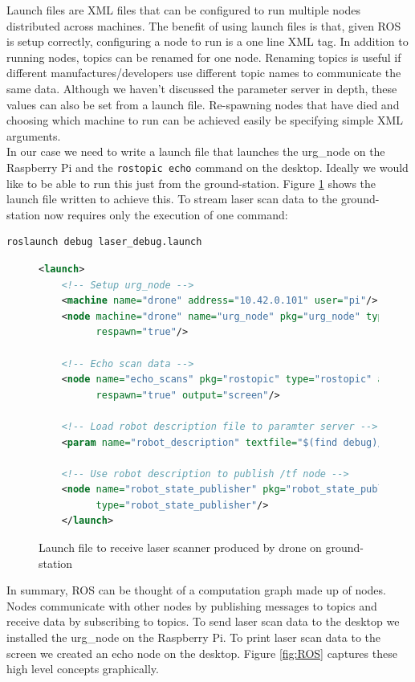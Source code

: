 \documentclass[capstone_report.tex]{subfiles}
\begin{document}
Launch files are XML files that can be configured to run multiple nodes distributed across machines.  The benefit of using launch files is that, given ROS is setup correctly, configuring a node to run is a one line XML tag.  In addition to running nodes, topics can be renamed for one node.  Renaming topics is useful if different manufactures/developers use different topic names to communicate the same data.  Although we haven’t discussed the parameter server in depth, these values can also be set from a launch file. Re-spawning nodes that have died and choosing which machine to run can be achieved easily be specifying simple XML arguments.\\

In our case we need to write a launch file that launches the urg\_node on the Raspberry Pi and the \texttt{rostopic echo} command on the desktop.  Ideally we would like to be able to run this just from the ground-station.  Figure \ref{fig:launch_file} shows the launch file written to achieve this.  To stream laser scan data to the ground-station now requires only the execution of one command: 

\begin{lstlisting}[language=bash]
    roslaunch debug laser_debug.launch
\end{lstlisting}

\begin{figure}[H]
    \centering
    \begin{lstlisting}[language=xml]
    <launch>
    <!-- Setup urg_node -->
    <machine name="drone" address="10.42.0.101" user="pi"/>
    <node machine="drone" name="urg_node" pkg="urg_node" type="urg_node" 
          respawn="true"/>

    <!-- Echo scan data -->
    <node name="echo_scans" pkg="rostopic" type="rostopic" args="echo \scan" 
          respawn="true" output="screen"/>

    <!-- Load robot description file to paramter server -->
    <param name="robot_description" textfile="$(find debug)/urdf/ursa.urdf"/>

    <!-- Use robot description to publish /tf node -->
    <node name="robot_state_publisher" pkg="robot_state_publisher" 
          type="robot_state_publisher"/>
    </launch>
    \end{lstlisting}
    \caption{Launch file to receive laser scanner produced by drone on ground-station}
    \label{fig:launch_file}
\end{figure}

In summary, ROS can be thought of a computation graph made up of nodes.  Nodes communicate with other nodes by publishing messages to topics and receive data by subscribing to topics.  To send laser scan data to the desktop we installed the urg\_node on the Raspberry Pi.   To print laser scan data to the screen we created an echo node on the desktop.  Figure \ref{fig:ROS} captures these high level concepts graphically.
\end{document}
